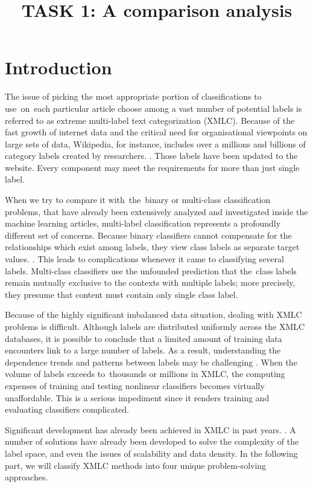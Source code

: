 \documentclass[a4paper]{article}
\title{TASK 1: A comparison analysis }
\begin{document}
\maketitle

\section{Introduction}
The issue of picking the most appropriate portion of classifications to use on each particular article choose among a vast number of potential labels is referred to as extreme multi-label text categorization (XMLC). Because of the fast growth of internet data and the critical need for organisational viewpoints on large sets of data, Wikipedia, for instance, includes over a millions and billions of category labels created by researchers. \cite{bib1}. Those labels have been updated to the website. Every component may meet the requirements for more than just single label.

When we try to compare it with the binary or multi-class classification problems, that have already been extensively analyzed and investigated inside the machine learning articles, multi-label classification represents a profoundly different set of concerns. Because binary classifiers cannot compensate for the relationships which exist among labels, they view class labels as separate target values. \cite{bib2}. This leads to complications whenever it came to classifying several labels. Multi-class classifiers use the unfounded prediction that the class labels remain mutually exclusive to the contexts with multiple labels; more precisely, they presume that content must contain only single class label.

Because of the highly significant imbalanced data situation, dealing with XMLC problems is difficult. Although labels are distributed uniformly across the XMLC databases, it is possible to conclude that a limited amount of training data encounters link to a large number of labels. As a result, understanding the dependence trends and patterns between labels may be challenging \cite{bib3}. When the volume of labels exceeds to thousands or millions in XMLC, the computing expenses of training and testing nonlinear classifiers becomes virtually unaffordable. This is a serious impediment since it renders training and evaluating classifiers complicated.

Significant development has already been achieved in XMLC in past years. \cite{bib4}. A number of solutions have already been developed to solve the complexity of the label space, and even the issues of scalability and data density. In the following part, we will classify XMLC methods into four unique problem-solving approaches.
\end{document}
